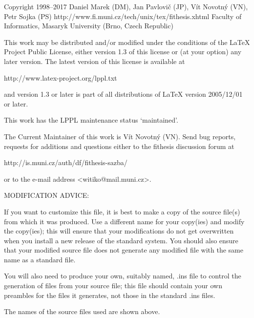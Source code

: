 
\preamble

Copyright 1998--2017  Daniel Marek (DM), Jan Pavlovič (JP),
                      Vít Novotný (VN), Petr Sojka (PS)
http://www.fi.muni.cz/tech/unix/tex/fithesis.xhtml
Faculty of Informatics, Masaryk University (Brno, Czech Republic)

This work may be distributed and/or modified under the
conditions of the LaTeX Project Public License, either version
1.3 of this license or (at your option) any later version.
The latest version of this license is available at

  http://www.latex-project.org/lppl.txt

and version 1.3 or later is part of all distributions of LaTeX
version 2005/12/01 or later.

This work has the LPPL maintenance status `maintained'.

The Current Maintainer of this work is Vít Novotný (VN).
Send bug reports, requests for additions and questions
either to the fithesis discussion forum at

  http://is.muni.cz/auth/df/fithesis-sazba/

or to the e-mail address <witiko@mail.muni.cz>.


MODIFICATION ADVICE:

If you want to customize this file, it is best to make a copy of
the source file(s) from which it was produced.  Use a different
name for your copy(ies) and modify the copy(ies); this will ensure
that your modifications do not get overwritten when you install a
new release of the standard system.  You should also ensure that
your modified source file does not generate any modified file with
the same name as a standard file.

You will also need to produce your own, suitably named, .ins file to
control the generation of files from your source file; this file
should contain your own preambles for the files it generates, not
those in the standard .ins files.

The names of the source files used are shown above.

\endpreamble
\askforoverwritefalse
